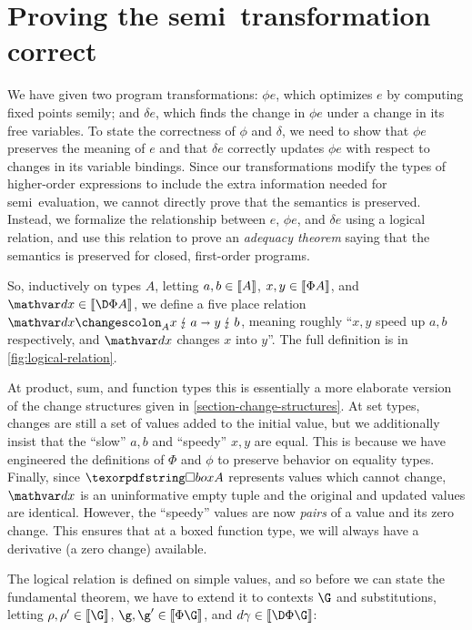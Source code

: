 \section{Proving the semi\naive\ transformation correct}


\label{section-logical-relation}

We have given two program transformations: $\phi e$, which optimizes $e$ by
computing fixed points semi\naive{}ly; and $\delta e$, which finds the change in
$\phi e$ under a change in its free variables.
%
To state the correctness of $\phi$ and $\delta$, we need to show that $\phi e$
preserves the meaning of $e$ and that $\delta e$ correctly updates $\phi e$ with
respect to changes in its variable bindings.
%
Since our transformations modify the types of higher-order expressions to
include the extra information needed for semi\naive\ evaluation, we cannot
directly prove that the semantics is preserved.
%
Instead, we formalize the relationship between $e$, $\phi e$, and $\delta e$
using a logical relation, and use this relation to prove an \emph{adequacy
  theorem} saying that the semantics is preserved for closed, first-order
programs.

%

So, inductively on types $A$, letting $a,b \in \llbracket{A}\rrbracket$, $x,y \in \llbracket{\Phi A}\rrbracket$,
and $\dx \in \den{\DP A}$, we define a five place relation
$\weirdat{A}{\dx}{x}{a}{y}{b}$, meaning roughly ``$x,y$ speed up $a,b$
respectively, and $\dx$ changes $x$ into $y$''. The full definition is in
\cref{fig:logical-relation}.

At product, sum, and function types this is essentially a more elaborate version
of the change structures given in \cref{section-change-structures}.
%
At set types, changes are still a set of values added to the initial value, but
we additionally insist that the ``slow'' $a,b$ and ``speedy'' $x,y$ are equal.
%
This is because we have engineered the definitions of $\Phi$ and $\phi$ to
preserve behavior on equality types.
%
Finally, since $\iso A$ represents values which cannot change, $\dx$ is an
uninformative empty tuple and the original and updated values are identical.
%
However, the ``speedy'' values are now \emph{pairs} of a value and its zero
change.
%
This ensures that at a boxed function type, we will always have a derivative (a
zero change) available.

The logical relation is defined on simple values, and so before we can state the
fundamental theorem, we have to extend it to contexts $\G$ and substitutions,
letting $\rho,\rho' \in \den{\G}$, $\g,\g' \in \den{\Phi\G}$, and $\dgamma \in
\den{\DP\G}$:

